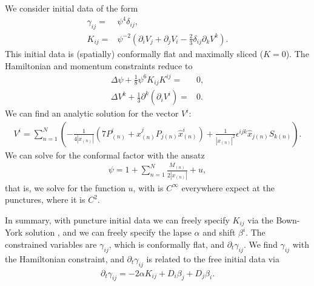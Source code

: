 \documentclass[%
notitlepage,
report,
nofootinbib,
 amsmath,amssymb,
 aps,
]{revtex4-1}
\begin{document}
We consider initial data of the form
\begin{subequations}
\begin{align}
   \gamma_{ij}
   =&
   \psi^4\delta_{ij}
   ,\\
   K_{ij}
   =&
   \psi^{-2}
   \left(
      \partial_iV_j
   +  \partial_jV_i
   -  \frac{2}{3}\delta_{ij}\partial_kV^k
   \right)
   .
\end{align}
\end{subequations}
   This initial data is (spatially)
conformally flat and maximally sliced ($K=0$).
The Hamiltonian and momentum constraints reduce to
\begin{align}
   \Delta \psi
+  \frac{1}{8}\psi^6K_{ij}K^{ij}
   =&
   0
   ,\\
   \Delta V^k
+  \frac{1}{3}\partial^k \left(\partial_iV^i\right)
   =&
   0
   .
\end{align}
   We can find an analytic solution for the vector $V^i$: 
\begin{align}
\label{eq:Bowen_York_sol}
   V^i
   =
   \sum_{n=1}^N
   \left(
   -  \frac{1}{4|x_{(n)}|}\left(
         7P_{(n)}^i
      +  \hat{x}^j_{(n)} P_{j(n)}\hat{x}_{(n)}^i
      \right)
   +  \frac{1}{| x_{(n)} |^2}
      \epsilon^{ijk}\hat{x}_{j(n)}S_{k(n)}
   \right)
   .
\end{align} 
We can solve for the conformal factor with the ansatz
\begin{align}
   \psi
   =
   1
+  \sum_{n=1}^N\frac{M_{(n)}}{2|x_{(n)}|}
+  u
   ,
\end{align} 
that is, we solve for the function $u$, with is $C^{\infty}$ everywhere
expect at the punctures, where it is $C^2$.

In summary, with puncture initial data we can freely specify
$K_{ij}$ via the Bown-York solution \cite{eq:Bowen_York_sol},
and we can freely specify the lapse $\alpha$ and shift $\beta^i$.
The constrained variables are $\gamma_{ij}$, which is
conformally flat, and $\partial_t\gamma_{ij}$.
We find $\gamma_{ij}$ with the Hamiltonian constraint,
and $\partial_t\gamma_{ij}$ is related to the free initial data via
\begin{align}
   \partial_t\gamma_{ij}
   =
   -
   2\alpha K_{ij}
   +
   D_i\beta_j
   +
   D_j\beta_i
   .
\end{align}
\end{document}
